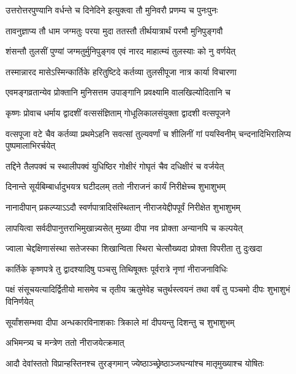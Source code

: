 \twolineshloka
{उत्तरोत्तरपुण्यानि वर्धन्ते च दिनेदिने}
{इत्युक्त्वा तौ मुनिवरौ प्रणम्य च पुनःपुनः} %

\twolineshloka
{तावनुज्ञाप्य तौ धाम जग्मतुः परया मुदा}
{ततस्तौ तीर्थयात्रार्थं परमौ मुनिपुङ्गवौ} %

\twolineshloka
{शंसन्तौ तुलसीं पुण्यां जग्मतुर्मुनिपुङ्गव}
{एवं नारद माहात्म्यं तुलस्याः को नु वर्णयेत्} %

\twolineshloka
{तस्मान्नारद मासेऽस्मिन्कार्तिके हरितुष्टिदे}
{कर्तव्या तुलसीपूजा नात्र कार्या विचारणा} %

\twolineshloka
{एवमङ्गव्रतान्येव प्रोक्तानि मुनिसत्तम}
{उपाङ्गानि प्रवक्ष्यामि वालखिल्योदितानि च} %





\twolineshloka
{कृष्णः प्रोवाच धर्माय द्वादशीं वत्ससंज्ञिताम्}
{गोधूलिकालसंयुक्ता द्वादशी वत्सपूजने} %

\threelineshloka
{वत्सपूजा वटे चैव कर्तव्या प्रथमेऽहनि}
{सवत्सां तुल्यवर्णां च शीलिनीं गां पयस्विनीम्}
{चन्दनादिभिरालिप्य पुष्पमालाभिरर्चयेत्} %

\twolineshloka
{तद्दिने तैलपक्वं च स्थालीपक्वं युधिष्ठिर}
{गोक्षीरं गोघृतं चैव दधिक्षीरं च वर्जयेत्} %

\twolineshloka
{दिनान्ते सूर्यबिम्बार्धादुभयत्र घटीदलम्}
{ततो नीराजनं कार्यं निरीक्षेच्च शुभाशुभम्} %

\twolineshloka
{नानादीपान् प्रकल्प्याऽऽदौ स्वर्णपात्रादिसंस्थितान्}
{नीराजयेद्दीपपूर्वं निरीक्षेत शुभाशुभम्} %

\twolineshloka
{लापयित्वा सर्वदीपानुत्तराभिमुखान्न्यसेत्}
{मुख्या दीपा नव प्रोक्ता अन्यानपि च कल्पयेत्} %

\twolineshloka
{ज्वाला चेद्दक्षिणासंस्था सतेजस्का शिखान्विता}
{स्थिरा चेत्सौख्यदा प्रोक्ता विपरीता तु दुःखदा} %

\twolineshloka
{कार्तिके कृष्णपत्रे तु द्वादश्यादिषु पञ्चसु}
{तिथिषूक्तः पूर्वरात्रे नृणां नीराजनाविधिः} %

\threelineshloka
{पक्षं संसूचयत्यादिर्द्वितीयो मासमेव च}
{तृतीय ऋतुमेवेह चतुर्थस्त्वयनं तथा}
{वर्षं तु पञ्चमो दीपः शुभाशुभं विनिर्णयेत्} %

\twolineshloka
{सूर्यांशसम्भवा दीपा अन्धकारविनाशकाः}
{त्रिकाले मां दीपयन्तु दिशन्तु च शुभाशुभम्} %


\onelineshloka
{अभिमन्त्र्य च मन्त्रेण ततो नीराजयेत्क्रमात्} %

\twolineshloka
{आदौ देवांस्ततो विप्रान्हस्तिनश्च तुरङ्गमान्}
{ज्येष्ठाञ्च्छ्रेष्ठाञ्जघन्यांश्च मातृमुख्याश्च योषितः} %

